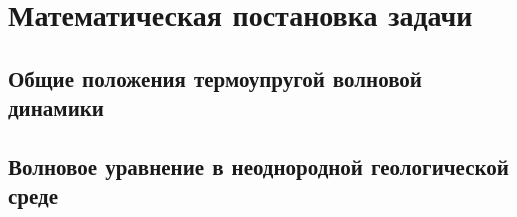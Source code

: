 \section{Математическая постановка задачи}

\subsection{Общие положения термоупругой волновой динамики}


\subsection{Волновое уравнение в неоднородной геологической среде}
